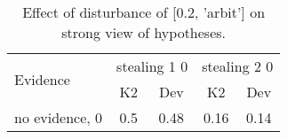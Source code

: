 \begin{table}\begin{tabular}{l|cc|cc}\toprule\multirow{2}{*}{Evidence} & \multicolumn{2}{c}{stealing 1 0}& \multicolumn{2}{c}{stealing 2 0}\\& {K2} & {Dev}& {K2} & {Dev}\\\midrule
no evidence, 0 & 0.5&0.48&0.16&0.14\\\bottomrule\end{tabular}\caption{Effect of disturbance of [0.2, 'arbit'] on strong view of hypotheses.}\end{table}